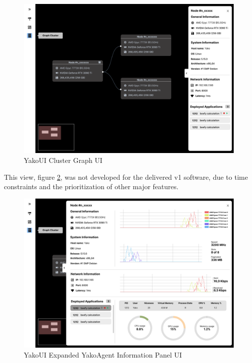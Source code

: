                 \begin{figure}[H]
                    \centering
                    \includegraphics[width=0.85\linewidth]{Images/Frontend/UI/YakoUI Graph Cluster UI.png}
                    \caption{YakoUI Cluster Graph UI}
                    \label{fig:cluster_graph_ui}
                \end{figure}
                
                This view, figure \ref{fig:expanded_info_panel_ui},  was not developed for the delivered v1 software, due to time constraints and the prioritization of other major features.
                
                \begin{figure}[H]
                    \centering
                    \includegraphics[width=0.85\linewidth]{Images/Frontend/UI/YakoUI Expanded YakoAgent Information Panel UI.png}
                    \caption{YakoUI Expanded YakoAgent Information Panel UI}
                    \label{fig:expanded_info_panel_ui}
                \end{figure}
            
